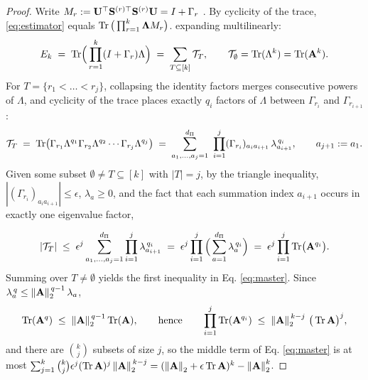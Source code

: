 \documentclass[11pt]{article}
\theoremstyle{plain}
\theoremstyle{definition}
\theoremstyle{remark}
\begin{document}
\begin{proof}
Write $M_r := \mathbf{U}^{\top}\mathbf{S}^{(r)\top}\mathbf{S}^{(r)}\mathbf{U} = I + \Gamma_r$ . By cyclicity of the trace, \eqref{eq:estimator} equals $\mathop{\mathrm{Tr}}\big(\prod_{r=1}^{k} \mathbf{\Lambda} M_r\big)$.
expanding multilinearly:
\begin{equation}\label{eq:expansion}
E_k \;=\; \operatorname{Tr}\!\Big( \prod_{r=1}^{k} (I + \Gamma_r) \Lambda \Big)
\;=\; \sum_{T \subseteq [k]} \mathcal{T}_T,
\qquad
\mathcal{T}_\emptyset = \operatorname{Tr}(\Lambda^k) = \operatorname{Tr}(\mathbf{A}^k).
\end{equation}
For $T = \{r_1 < \dots < r_j\}$, collapsing the identity factors merges consecutive powers of $\Lambda$, and cyclicity of the trace places exactly $q_i$ factors of $\Lambda$ between $\Gamma_{r_i}$ and $\Gamma_{r_{i+1}}$:
\begin{equation}\label{eq:term-index}
\mathcal{T}_T
\;=\; \operatorname{Tr}\!\big( \Gamma_{r_1} \Lambda^{q_1} \Gamma_{r_2} \Lambda^{q_2} \cdots \Gamma_{r_j} \Lambda^{q_j} \big)
\;=\; \sum_{a_1,\dots,a_j = 1}^{d_{\Pi}}\ \prod_{i=1}^{j} (\Gamma_{r_i})_{a_i a_{i+1}}\, \lambda_{a_{i+1}}^{\,q_i},
\qquad a_{j+1} := a_1 .
\end{equation}
Given some subset $\emptyset \neq T \subseteq [k]$ with $|T| = j$, by the triangle inequality, $|(\Gamma_{r_i})_{a_i a_{i+1}}| \le \epsilon$, $\lambda_a \ge 0$, and the fact that each summation index $a_{i+1}$ occurs in exactly one eigenvalue factor,

 
\begin{equation}\label{eq:perterm}
|\mathcal{T}_T| \;\le\; \epsilon^{j} \sum_{a_1,\dots,a_j=1}^{d_{\Pi}} \prod_{i=1}^{j} \lambda_{a_{i+1}}^{\,q_i}
\;=\; \epsilon^{j} \prod_{i=1}^{j} \Big( \sum_{a=1}^{d_{\Pi}} \lambda_a^{\,q_i} \Big)
\;=\; \epsilon^{j} \prod_{i=1}^{j} \operatorname{Tr}\!\big(\mathbf{A}^{q_i} \big).
\end{equation}
Summing over $T \neq \emptyset$ yields the first inequality in Eq. \eqref{eq:master}. Since $\lambda_a^{\,q} \le \left\| \mathbf{A} \right\|_{2}^{\,q-1} \lambda_a$,
\begin{equation}\label{eq:tr-power}
\operatorname{Tr}(\mathbf{A}^{q}) \;\le\; \left\| \mathbf{A} \right\|_{2}^{\,q-1} \operatorname{Tr}(\mathbf{A}),
\qquad \text{hence} \qquad
\prod_{i=1}^{j} \operatorname{Tr}(\mathbf{A}^{q_i}) \;\le\; \left\| \mathbf{A} \right\|_{2}^{\,k-j}\, \big(\operatorname{Tr} \mathbf{A}\big)^{j},
\end{equation}
and there are $\binom{k}{j}$ subsets of size $j$, so the middle term of Eq. \eqref{eq:master} is at most
$\sum_{j=1}^{k} \binom{k}{j} \epsilon^j (\operatorname{Tr}\mathbf{A})^j \left\| \mathbf{A} \right\|_{2}^{\,k-j} = (\left\| \mathbf{A} \right\|_{2} + \epsilon\operatorname{Tr}\mathbf{A})^k - \left\| \mathbf{A} \right\|_{2}^k$.


\end{proof}
\end{document}
